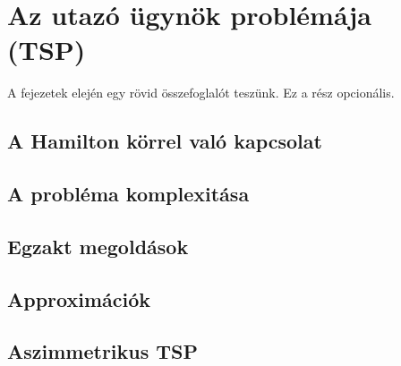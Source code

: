 \chapter{Az utazó ügynök problémája (TSP)}\label{ch:ALAP}

\begin{osszefoglal}
	A fejezetek elején egy rövid összefoglalót teszünk. Ez a rész opcionális.
	
\end{osszefoglal}


\section{A Hamilton körrel való kapcsolat}\label{sec:ALAP:adatelem}

\section{A probléma komplexitása}\label{sec:ALAP:adatelem}

\section{Egzakt megoldások}\label{sec:ALAP:adatelem}

\section{Approximációk}\label{sec:ALAP:adatelem}

\section{Aszimmetrikus TSP}\label{sec:ALAP:adatelem}